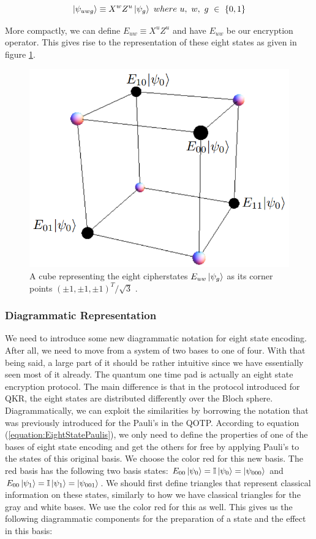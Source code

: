 \documentclass[]{article}
\begin{document}
\begin{equation}
	\label{equation:EightStatePaulis}
	\ket{\psi_{uwg}} \equiv X^w Z^u\ket{\psi_{g}}~where~ u,~ w,~ g~ \in~ \{0,1\}
\end{equation}

More compactly, we can define $E_{uw} \equiv X^u Z^u$ and have $E_{uw}$ be our encryption operator. This gives rise to the representation of these eight states as given in figure \ref{fig:eightstatecube}.

\begin{center}
\begin{figure}
	\begin{center}
	\includegraphics[width=0.5\linewidth]{Eightstatecube.png}
	\caption{A cube representing the eight cipherstates $E_{uw}\ket{\psi_{g}}$ as its corner points $(\pm1,\pm1,\pm1)^T/\sqrt{3}$ \cite{DeVries2016}.}
	\label{fig:eightstatecube}
	\end{center}
\end{figure}
\end{center}

\subsubsection{Diagrammatic Representation}
We need to introduce some new diagrammatic notation for eight state encoding. After all, we need to move from a system of two bases to one of four. With that being said, a large part of it should be rather intuitive since we have essentially seen most of it already. The quantum one time pad is actually an eight state encryption protocol. The main difference is that in the protocol introduced for QKR, the eight states are distributed differently over the Bloch sphere. Diagrammatically, we can exploit the similarities by borrowing the notation that was previously introduced for the Pauli's in the QOTP. According to equation (\ref{equation:EightStatePaulis}), we only need to define the properties of one of the bases of eight state encoding and get the others for free by applying Pauli's to the states of this original basis. We choose the color red for this new basis. The red basis has the following two basis states: $E_{00}\ket{\psi_{0}} = \mathbb{I}\ket{\psi_{0}} = \ket{\psi_{000}}$ and $E_{00}\ket{\psi_{1}} = \mathbb{I}\ket{\psi_{1}} = \ket{\psi_{001}}$. We should first define triangles that represent classical information on these states, similarly to how we have classical triangles for the gray and white bases. We use the color red for this as well. This gives us the following diagrammatic components for the preparation of a state and the effect in this basis:
\end{document}
